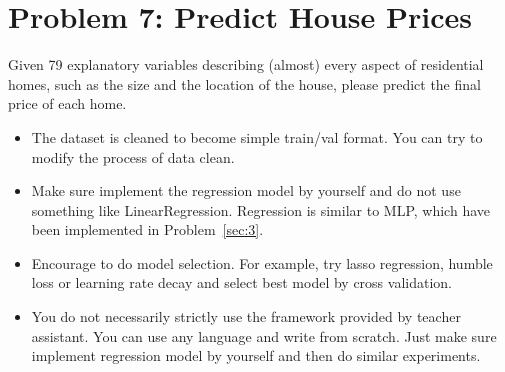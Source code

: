 \documentclass[12pt]{article}
\begin{document}
\section{Problem 7: Predict House Prices} \label{sec:4}
Given 79 explanatory variables describing (almost) every aspect of residential homes, such as the size  and the location of the house, please predict the final price of each home.

\begin{itemize}

	\item The dataset is cleaned to become simple train/val format. You can try to modify the process of data clean.
	\item Make sure implement the regression model by yourself and do not use something like LinearRegression.  Regression is similar to MLP, which have been implemented in  Problem~\ref{sec:3}.

	\item Encourage to do model selection. For example, try lasso regression, humble loss or learning rate decay and select best model by cross validation. 

	\item You do not necessarily strictly use the framework provided by teacher assistant. You can use any language and write from scratch. Just make sure implement regression model by yourself and then do similar experiments. 
\end{itemize}
\end{document}
